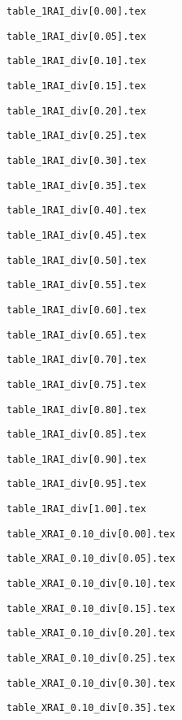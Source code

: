 \documentclass{article}
\begin{document}
\newpage
\verb|table_1RAI_div[0.00].tex|

\newpage
\verb|table_1RAI_div[0.05].tex|

\newpage
\verb|table_1RAI_div[0.10].tex|

\newpage
\verb|table_1RAI_div[0.15].tex|

\newpage
\verb|table_1RAI_div[0.20].tex|

\newpage
\verb|table_1RAI_div[0.25].tex|

\newpage
\verb|table_1RAI_div[0.30].tex|

\newpage
\verb|table_1RAI_div[0.35].tex|

\newpage
\verb|table_1RAI_div[0.40].tex|

\newpage
\verb|table_1RAI_div[0.45].tex|

\newpage
\verb|table_1RAI_div[0.50].tex|

\newpage
\verb|table_1RAI_div[0.55].tex|

\newpage
\verb|table_1RAI_div[0.60].tex|

\newpage
\verb|table_1RAI_div[0.65].tex|

\newpage
\verb|table_1RAI_div[0.70].tex|

\newpage
\verb|table_1RAI_div[0.75].tex|

\newpage
\verb|table_1RAI_div[0.80].tex|

\newpage
\verb|table_1RAI_div[0.85].tex|

\newpage
\verb|table_1RAI_div[0.90].tex|

\newpage
\verb|table_1RAI_div[0.95].tex|

\newpage
\verb|table_1RAI_div[1.00].tex|

\newpage
\verb|table_XRAI_0.10_div[0.00].tex|

\newpage
\verb|table_XRAI_0.10_div[0.05].tex|

\newpage
\verb|table_XRAI_0.10_div[0.10].tex|

\newpage
\verb|table_XRAI_0.10_div[0.15].tex|

\newpage
\verb|table_XRAI_0.10_div[0.20].tex|

\newpage
\verb|table_XRAI_0.10_div[0.25].tex|

\newpage
\verb|table_XRAI_0.10_div[0.30].tex|

\newpage
\verb|table_XRAI_0.10_div[0.35].tex|
\end{document}
